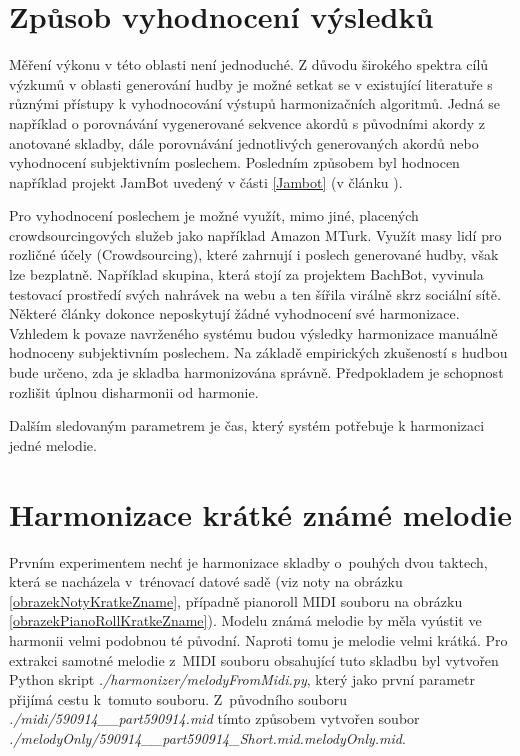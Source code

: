 \section{Způsob vyhodnocení výsledků}
Měření výkonu v této oblasti není jednoduché.
Z důvodu širokého spektra cílů výzkumů v oblasti generování hudby
je možné setkat se v existující literatuře s různými přístupy
k  vyhodnocování výstupů harmonizačních algoritmů.
Jedná se například o porovnávání vygenerované sekvence akordů
s původními akordy z anotované skladby,
dále porovnávání jednotlivých generovaných akordů
nebo vyhodnocení subjektivním poslechem.
\cite{Raczynski}
Posledním způsobem byl hodnocen například projekt JamBot
uvedený v části \ref{Jambot} (v článku \cite{Brunner_Jambot}).
\par

Pro vyhodnocení poslechem je možné využít, mimo jiné,
placených crowdsourcingových služeb jako například Amazon MTurk.
Využít masy lidí pro rozličné účely (Crowdsourcing),
které zahrnují i poslech generované hudby,
však lze bezplatně.
Například skupina, která stojí za projektem BachBot,
vyvinula testovací prostředí svých nahrávek na webu
a ten šířila virálně skrz sociální sítě.
\cite{Liang_AutomaticComposition}
Některé články dokonce neposkytují žádné vyhodnocení
své harmonizace.
\cite{Raczynski}
Vzhledem k povaze navrženého systému
budou výsledky harmonizace 
manuálně hodnoceny subjektivním poslechem.
Na základě empirických zkušeností s hudbou 
bude určeno, zda je skladba harmonizována správně.
Předpokladem je schopnost rozlišit úplnou disharmonii 
od harmonie.
\par

Dalším sledovaným parametrem je čas,
který systém potřebuje k harmonizaci jedné melodie.

\section{Harmonizace krátké známé melodie}
Prvním experimentem nechť je harmonizace skladby o~pouhých dvou taktech,
která se nacházela v~trénovací datové sadě 
(viz noty na obrázku \ref{obrazekNotyKratkeZname},
případně pianoroll MIDI souboru na obrázku \ref{obrazekPianoRollKratkeZname}).
Modelu známá melodie by měla vyústit ve harmonii velmi podobnou té původní.
Naproti tomu je melodie velmi krátká.
Pro extrakci samotné melodie z~MIDI souboru obsahující tuto skladbu 
byl vytvořen Python skript \emph{./harmonizer/melodyFromMidi.py}, 
který jako první parametr přijímá cestu k~tomuto souboru.
Z~původního souboru \emph{./midi/590914\_\_part590914.mid}
tímto způsobem vytvořen soubor 
\emph{./melodyOnly/590914\_\_part590914\_Short.mid.melodyOnly.mid}.

